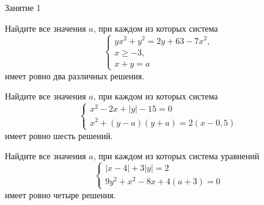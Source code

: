 %
%

\begin{class}[number=1]
	\begin{listofex}
		\item Занятие 1
	\end{listofex}
\end{class}

\begin{class}[number=2]
	\begin{listofex}
		\item Найдите все значения \(a\), при каждом из которых система \[ \begin{cases} yx^2+y^2=2y+63-7x^2, \\ x \ge -3, \\ x+y=a  \end{cases} \] имеет ровно два различных решения.
		\item Найдите все значения \(a\), при каждом из которых система \[ \begin{cases} x^2-2x+|y|-15=0 \\ x^2+(y-a)(y+a)=2 (x-0,5)  \end{cases} \] имеет ровно шесть решений.
		\item Найдите все значения \(a\), при каждом из которых система уравнений \[ \begin{cases} |x-4|+3|y|=2 \\ 9y^2+x^2-8x+4(a+3)=0 \end{cases} \] имеет ровно четыре решения.
	\end{listofex}
\end{class}

